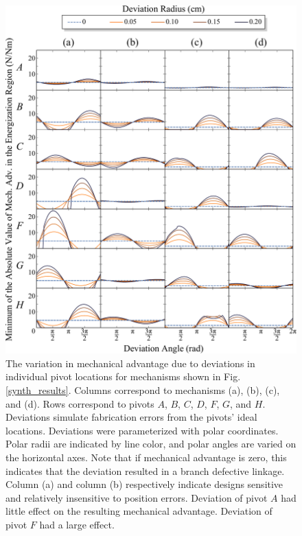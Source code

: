 \documentclass[journal]{IEEEtran}
\begin{document}
\begin{figure}[t]
\centering
\includegraphics[width=1\linewidth]{PointByPointDeviation}
\caption{The variation in mechanical advantage due to deviations in individual pivot locations for mechanisms shown in Fig. \ref{synth_results}.  Columns correspond to mechanisms (a), (b), (c), and (d).  Rows correspond to pivots $A$, $B$, $C$, $D$, $F$, $G$, and $H$.  Deviations simulate fabrication errors from the pivots' ideal locations.  Deviations were parameterized with polar coordinates.  Polar radii are indicated by line color, and polar angles are varied on the horizontal axes.  Note that if mechanical advantage is zero, this indicates that the deviation resulted in a branch defective linkage.  Column (a) and column (b) respectively indicate designs sensitive and relatively insensitive to position errors.  Deviation of pivot $A$ had little effect on the resulting mechanical advantage.  Deviation of pivot $F$ had a large effect.}
\label{PointByPointDeviation}
\end{figure}
\end{document}
